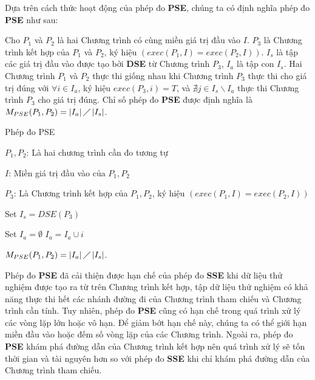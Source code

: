 \newpage


Dựa trên cách thức hoạt động của phép đo \textbf{PSE}, chúng ta có định nghĩa phép đo \textbf{PSE} như sau:
\begin{definition}
	Cho $P_{1}$ và $P_{2}$ là hai Chương trình có cùng miền giá trị đầu vào $I$. $P_{3}$ là Chương trình
	kết hợp của $P_{1}$ và $P_{2}$, ký hiệu $(exec(P_{1}, I) =  exec(P_{2}, I))$.  $I_{s}$ là tập các giá trị đầu vào được tạo bởi \textbf{DSE} từ Chương trình $P_{3}$, $I_{a}$ là tập con $I_{s}$. Hai Chương trình $P_{1}$ và $P_{2}$ thực thi giống nhau khi Chương trình $P_{3}$ thực thi cho giá trị đúng với $\forall i \in I_{a}$, ký hiệu $exec(P_{3}, i) = T$, và $\nexists j \in I_{s} \backslash I_{a}$ thực thi Chương trình $P_{3}$ cho giá trị đúng. Chỉ số phép đo \textbf{PSE} được định nghĩa là $M_{PSE}(P_{1}, P_{2}) = \left|I_{a}\right| \diagup \left|I_{s}\right| $.
\end{definition}

\begin{algorithm}[h]
	\caption{Phép đo PSE}
	\begin{algorithmic}	
		\item $P_{1}, P_{2}$: Là hai chương trình cần đo tương tự
		\item $I$: Miền giá trị đầu vào của $P_{1}, P_{2}$
		\item $P_{3}$: Là Chương trình kết hợp của $P_{1}, P_{2}$, ký hiệu  $(exec(P_{1}, I) = exec(P_{2}, I))$
		\item Set $I_{s} = DSE(P_{3})$ 
		\item Set $I_{a} = \emptyset$ 
		  		
			\State $I_{a} = I_{a} \cup i$		
			\EndIf
		\EndWhile
		\item $M_{PSE}(P_{1}, P_{2}) = \left|I_{a}\right| \diagup \left|I_{s}\right| $. 
	\end{algorithmic}
\end{algorithm}

Phép đo \textbf{PSE} đã cải thiện được hạn chế của phép đo \textbf{SSE} khi dữ liệu thử nghiệm được  tạo ra từ trên Chương trình kết hợp, tập dữ liệu thử nghiệm có khả năng thực thi hết các nhánh đường đi của Chương trình tham chiếu và Chương trình cần tính. Tuy nhiên, phép đo \textbf{PSE} cũng có hạn chế trong quá trình xử lý các vòng lặp lớn hoặc vô hạn. Để giảm bớt hạn chế này, chúng ta có thể giới hạn miền đầu vào hoặc đếm số vòng lặp của các Chương trình. Ngoài ra, phép đo \textbf{PSE} khám phá đường dẫn của Chương trình kết hợp nên quá trình xử lý sẽ tốn thời gian và tài nguyên hơn so với phép đo \textbf{SSE} khi chỉ khám phá đường dẫn của Chương trình tham chiếu.
  